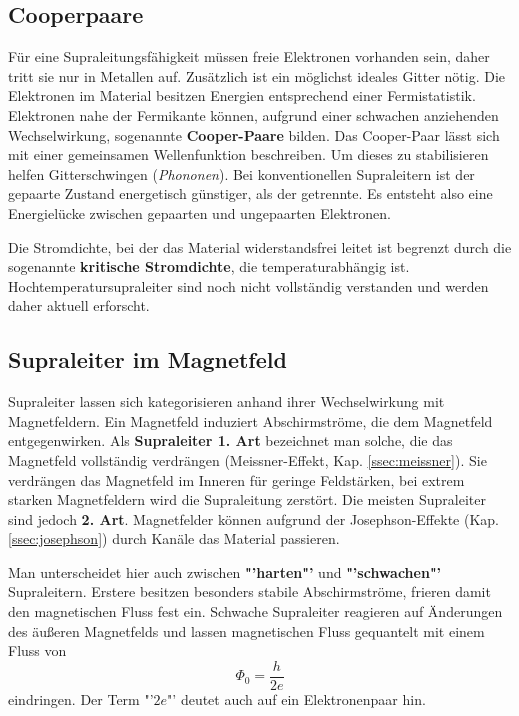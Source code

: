 \documentclass[a4paper,ngerman]{scrartcl}
\begin{document}
\subsection{Cooperpaare}

Für eine Supraleitungsfähigkeit müssen freie Elektronen vorhanden sein, daher tritt sie nur in Metallen auf.
Zusätzlich ist ein möglichst ideales Gitter nötig.
Die Elektronen im Material besitzen Energien entsprechend einer Fermistatistik.
Elektronen nahe der Fermikante können, aufgrund einer schwachen anziehenden Wechselwirkung, sogenannte \textbf{Cooper-Paare} bilden.
Das Cooper-Paar lässt sich mit einer gemeinsamen Wellenfunktion beschreiben. 
Um dieses zu stabilisieren helfen Gitterschwingen (\textit{Phononen}). 
Bei konventionellen Supraleitern ist der gepaarte Zustand energetisch günstiger, als der getrennte.
Es entsteht also eine Energielücke zwischen gepaarten und ungepaarten Elektronen. 

Die Stromdichte, bei der das Material widerstandsfrei leitet ist begrenzt durch die sogenannte \textbf{kritische Stromdichte}, die temperaturabhängig ist.
Hochtemperatursupraleiter sind noch nicht vollständig verstanden und werden daher aktuell erforscht.



\subsection{Supraleiter im Magnetfeld}

Supraleiter lassen sich kategorisieren anhand ihrer Wechselwirkung mit Magnetfeldern. 
Ein Magnetfeld induziert Abschirmströme, die dem Magnetfeld entgegenwirken.
Als \textbf{Supraleiter 1. Art} bezeichnet man solche, die das Magnetfeld vollständig verdrängen (Meissner-Effekt, Kap. \ref{ssec:meissner}).  
Sie verdrängen das Magnetfeld im Inneren für geringe Feldstärken, bei extrem starken Magnetfeldern wird die Supraleitung zerstört.
Die meisten Supraleiter sind jedoch \textbf{2. Art}.
Magnetfelder können aufgrund der Josephson-Effekte (Kap. \ref{ssec:josephson}) durch Kanäle das Material passieren.

Man unterscheidet hier auch zwischen \textbf{"'harten"'} und \textbf{"'schwachen"'} Supraleitern.
Erstere besitzen besonders stabile Abschirmströme, frieren damit den magnetischen Fluss fest ein.
Schwache Supraleiter reagieren auf Änderungen des äußeren Magnetfelds und lassen magnetischen Fluss gequantelt mit einem Fluss von
\begin{equation}
\Phi_\mathrm{0} = \frac{h}{2 e}
\end{equation}
eindringen. 
Der Term "'$2 e$"' deutet auch auf ein Elektronenpaar hin.
\end{document}

